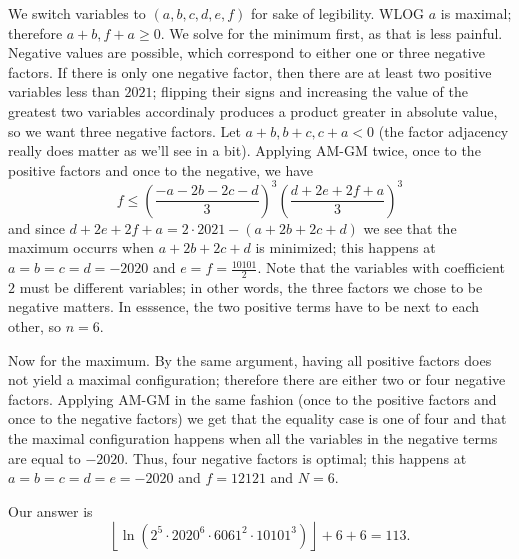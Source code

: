 \begin{solution}\hfil\medskip
	
	We switch variables to $(a, b, c, d, e, f)$ for sake of legibility. WLOG $a$ is maximal; therefore $a + b, f + a \geq 0$. 
    We solve for the minimum first, as that is less painful. Negative values are possible, which correspond to either one or three negative factors.
    If there is only one negative factor, then there are at least two positive variables less than $2021$; flipping their signs and increasing
    the value of the greatest two variables accordinaly produces a product greater in absolute value, so we want three negative factors.
    Let $a + b, b + c, c + a < 0$ (the factor adjacency really does matter as we'll see in a bit). Applying AM-GM twice, once to the positive factors and once to the negative, we have
    $$f \leq \left(\dfrac{-a - 2b - 2c - d}{3}\right)^3\left(\dfrac{d + 2e + 2f + a}{3}\right)^3$$
    and since $d + 2e + 2f + a = 2 \cdot 2021 - (a + 2b + 2c + d)$ we see that the maximum occurrs when $a + 2b + 2c + d$ is minimized;
    this happens at $a = b = c = d = -2020$ and $e = f = \frac{10101}{2}$. Note that the variables with coefficient $2$ must be different variables; in other words, the three factors we chose to be negative matters.
    In esssence, the two positive terms have to be next to each other, so $n = 6$.\medskip

    Now for the maximum. By the same argument, having all positive factors does not yield a maximal configuration; therefore there are either two or four negative factors.
    Applying AM-GM in the same fashion (once to the positive factors and once to the negative factors) we get that the equality case is one of four
    and that the maximal configuration happens when all the variables in the negative terms are equal to $-2020$. Thus, four negative factors is optimal;
    this happens at $a = b = c = d = e = -2020$ and $f = 12121$ and $N = 6$.\medskip

    Our answer is $$\left\lfloor \ln\left(2^5 \cdot 2020^6 \cdot 6061^2 \cdot 10101^3\right) \right\rfloor + 6 + 6 = \boxed{113}.$$
\end{solution}\bigskip
